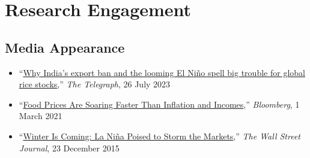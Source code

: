 \documentclass[10pt]{article}
\begin{document}
	\section*{Research Engagement}
	
	\subsection*{Media Appearance}
	\begin{itemize}
		\item ``\href{https://www.telegraph.co.uk/global-health/climate-and-people/india-rice-export-global-ban-food-security-shortsages/}{Why India’s export ban and the looming El Niño spell big trouble for global rice stocks},'' \textit{The Telegraph}, 26 July 2023
		\item ``\href{https://www.bloomberg.com/news/articles/2021-03-01/inflation-2021-malnutrition-and-hunger-fears-rise-as-food-prices-soar-globally}{Food Prices Are Soaring Faster Than Inflation and Incomes},'' \textit{Bloomberg}, 1 March 2021
		\item ``\href{https://www.wsj.com/articles/winter-is-coming-la-nina-poised-to-storm-the-markets-1450850704}{Winter Is Coming: La Niña Poised to Storm the Markets},'' \textit{The Wall Street Journal}, 23 December 2015
	\end{itemize}
	
\end{document}
